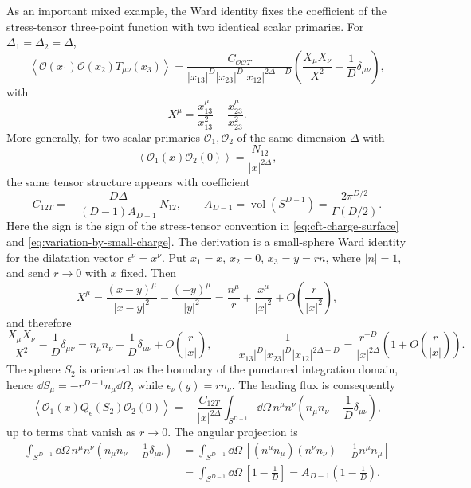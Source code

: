 As an important mixed example, the Ward identity fixes the coefficient of the
stress-tensor three-point function with two identical scalar primaries.  For
\(\Delta_1=\Delta_2=\Delta\),
\begin{equation}
  \left\langle
    \mathcal O(x_1)\mathcal O(x_2)T_{\mu\nu}(x_3)
  \right\rangle
  =
  \frac{C_{\mathcal O\mathcal O T}}
  {|x_{13}|^D|x_{23}|^D|x_{12}|^{2\Delta-D}}
  \left(
    \frac{X_\mu X_\nu}{X^2}
    -
    \frac1D\delta_{\mu\nu}
  \right),
  \label{eq:scalar-scalar-stress-tensor-three-point}
\end{equation}
with
\[
  X^\mu=\frac{x_{13}^\mu}{x_{13}^2}
       -\frac{x_{23}^\mu}{x_{23}^2}.
\]
More generally, for two scalar primaries \(\mathcal O_1,\mathcal O_2\) of the
same dimension \(\Delta\) with
\[
  \left\langle
    \mathcal O_1(x)\mathcal O_2(0)
  \right\rangle
  =
  \frac{N_{12}}{|x|^{2\Delta}},
\]
the same tensor structure appears with coefficient
\begin{equation}
  C_{12T}
  =
  -\,\frac{D\Delta}{(D-1)A_{D-1}}\,N_{12},
  \qquad
  A_{D-1}=\operatorname{vol}(S^{D-1})
  =
  \frac{2\pi^{D/2}}{\Gamma(D/2)}.
  \label{eq:scalar-scalar-stress-ward-coefficient}
\end{equation}
Here the sign is the sign of the stress-tensor convention in
\eqref{eq:cft-charge-surface} and \eqref{eq:variation-by-small-charge}.  The
derivation is a small-sphere Ward identity for the dilatation vector
\(\epsilon^\nu=x^\nu\).  Put \(x_1=x\), \(x_2=0\), \(x_3=y=r n\), where
\(|n|=1\), and send \(r\to0\) with \(x\) fixed.  Then
\[
  X^\mu
  =
  \frac{(x-y)^\mu}{|x-y|^2}
  -
  \frac{(-y)^\mu}{|y|^2}
  =
  \frac{n^\mu}{r}+\frac{x^\mu}{|x|^2}+O\!\left(\frac{r}{|x|^2}\right),
\]
and therefore
\[
  \frac{X_\mu X_\nu}{X^2}-\frac1D\delta_{\mu\nu}
  =
  n_\mu n_\nu-\frac1D\delta_{\mu\nu}+O\!\left(\frac{r}{|x|}\right),
  \qquad
  \frac1{|x_{13}|^D|x_{23}|^D|x_{12}|^{2\Delta-D}}
  =
  \frac{r^{-D}}{|x|^{2\Delta}}
  \left(1+O\!\left(\frac{r}{|x|}\right)\right).
\]
The sphere \(S_2\) is oriented as the boundary of the punctured integration
domain, hence \(\dd S_\mu=-r^{D-1}n_\mu\dd\Omega\), while
\(\epsilon_\nu(y)=r n_\nu\).  The leading flux is consequently
\[
  \left\langle
    \mathcal O_1(x)Q_\epsilon(S_2)\mathcal O_2(0)
  \right\rangle
  =
  -\,\frac{C_{12T}}{|x|^{2\Delta}}
  \int_{S^{D-1}}\dd\Omega\,
  n^\mu n^\nu
  \left(
    n_\mu n_\nu-\frac1D\delta_{\mu\nu}
  \right),
\]
up to terms that vanish as \(r\to0\).  The angular projection is
\begin{align}
  \int_{S^{D-1}}\dd\Omega\,
  n^\mu n^\nu
  \left(
    n_\mu n_\nu-\frac1D\delta_{\mu\nu}
  \right)
  &=
  \int_{S^{D-1}}\dd\Omega\,
  \left[
    (n^\mu n_\mu)(n^\nu n_\nu)
    -
    \frac1D n^\mu n_\mu
  \right]
  \nonumber\\
  &=
  \int_{S^{D-1}}\dd\Omega\,
  \left[
    1-\frac1D
  \right]
  =
  A_{D-1}\left(1-\frac1D\right).
  \label{eq:scalar-stress-ward-angular-projection}
\end{align}
